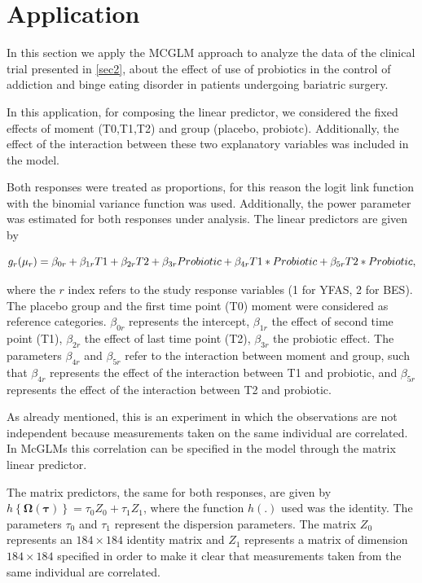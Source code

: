\documentclass[AMA,STIX1COL]{WileyNJD-v2}
\begin{document}

\section{Application}\label{sec6}


In this section we apply the MCGLM approach to analyze the data of the clinical trial presented in \autoref{sec2}, about the effect of use of probiotics in the control of addiction and binge eating disorder in patients undergoing bariatric surgery.

In this application, for composing the linear predictor, we considered the fixed effects of moment (T0,T1,T2) and group (placebo, probiotc). Additionally, the effect of the interaction between these two explanatory variables was included in the model. 

Both responses were treated as proportions, for this reason the logit link function with the binomial variance function was used. Additionally, the power parameter was estimated for both responses under analysis. The linear predictors are given by

$$
g_{r}(\mu_{r}) = \beta_{0r} + \beta_{1r} T1 + \beta_{2r} T2 + \beta_{3r} Probiotic + \\ \beta_{4r} T1*Probiotic + \beta_{5r} T2*Probiotic,
$$

\noindent where the $r$ index refers to the study response variables (1 for YFAS, 2 for BES). The placebo group and the first time point (T0) moment were considered as reference categories. $\beta_{0r}$ represents the intercept, $\beta_{1r}$ the effect of second time point (T1), $\beta_{2r}$ the effect of last time point (T2), $\beta_{3r}$ the probiotic effect. The parameters $\beta_{4r}$ and $\beta_{5r}$ refer to the interaction between moment and group, such that $\beta_{4r}$ represents the effect of the interaction between T1 and probiotic, and $ \beta_{5r}$ represents the effect of the interaction between T2 and probiotic.

As already mentioned, this is an experiment in which the observations are not independent because measurements taken on the same individual are correlated. In McGLMs this correlation can be specified in the model through the matrix linear predictor.

The matrix predictors, the same for both responses, are given by $h\left \{ \boldsymbol{\Omega}(\boldsymbol{\tau}) \right \} = \tau_0Z_0 + \tau_1Z_1$, where the function $h(.)$ used was the identity. The parameters $\tau_0$ and $\tau_1$ represent the dispersion parameters. The matrix $Z_0$ represents an $184 \times 184$ identity matrix and $Z_1$ represents a matrix of dimension $184 \times 184$ specified in order to make it clear that measurements taken from the same individual are correlated. 
\end{document}
